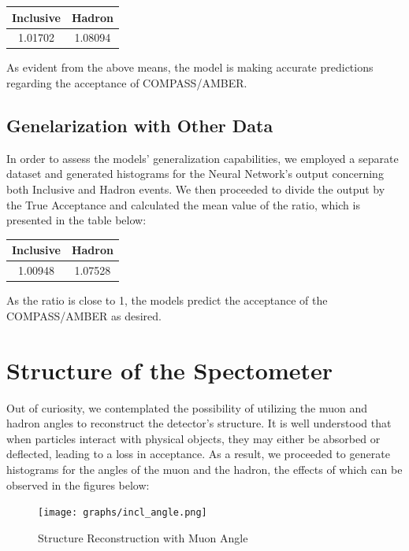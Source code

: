 \documentclass[EPJ,twocolumn]{webofc}
\begin{document}
\begin{table}[H]
    \centering
    \begin{tabular}{c|c}
    \textbf{Inclusive} & \textbf{Hadron} \\ \hline
    1.01702 & 1.08094 \\
    \end{tabular}
\end{table}


As evident from the above means, the model is making accurate predictions regarding the acceptance of COMPASS/AMBER.


\subsection{Genelarization with Other Data}
In order to assess the models' generalization capabilities, we employed a separate dataset and generated histograms for the Neural Network's output concerning both Inclusive and Hadron events.
We then proceeded to divide the output by the True Acceptance and calculated the mean value of the ratio, which is presented in the table below:

\begin{table}[H]
    \centering
    \begin{tabular}{c|c}
    \textbf{Inclusive} & \textbf{Hadron} \\ \hline
    1.00948 & 1.07528 \\ 
    \end{tabular}
\end{table}

As the ratio is close to 1, the models predict the acceptance of the COMPASS/AMBER as desired.

\section{Structure of the Spectometer}
Out of curiosity, we contemplated the possibility of utilizing the muon and hadron angles to reconstruct the detector's structure. It is well understood that when particles interact with physical objects, they may either be absorbed or deflected, leading to a loss in acceptance. As a result, we proceeded to generate histograms for the angles of the muon and the hadron, the effects of which can be observed in the figures below:


    \begin{figure}[H]
        \texttt{[image: graphs/incl\_angle.png]}
        \caption{Structure Reconstruction with Muon Angle}
        \label{fig:muon_angle}
    \end{figure}
    
\end{document}
